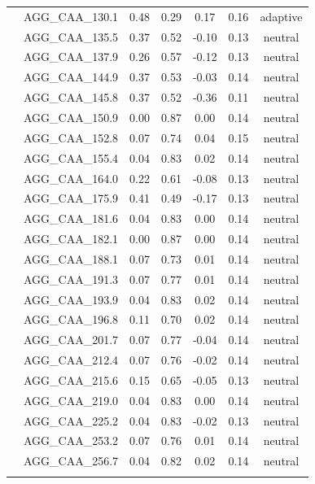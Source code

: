 \documentclass[11pt,]{article}
\begin{document}
\begin{longtable}[c]{@{}lcccccc@{}}
\\\addlinespace
& AGG\_CAA\_130.1 & 0.48 & 0.29 & 0.17 & 0.16 & adaptive
\\\addlinespace
& AGG\_CAA\_135.5 & 0.37 & 0.52 & -0.10 & 0.13 & neutral
\\\addlinespace
& AGG\_CAA\_137.9 & 0.26 & 0.57 & -0.12 & 0.13 & neutral
\\\addlinespace
& AGG\_CAA\_144.9 & 0.37 & 0.53 & -0.03 & 0.14 & neutral
\\\addlinespace
& AGG\_CAA\_145.8 & 0.37 & 0.52 & -0.36 & 0.11 & neutral
\\\addlinespace
& AGG\_CAA\_150.9 & 0.00 & 0.87 & 0.00 & 0.14 & neutral
\\\addlinespace
& AGG\_CAA\_152.8 & 0.07 & 0.74 & 0.04 & 0.15 & neutral
\\\addlinespace
& AGG\_CAA\_155.4 & 0.04 & 0.83 & 0.02 & 0.14 & neutral
\\\addlinespace
& AGG\_CAA\_164.0 & 0.22 & 0.61 & -0.08 & 0.13 & neutral
\\\addlinespace
& AGG\_CAA\_175.9 & 0.41 & 0.49 & -0.17 & 0.13 & neutral
\\\addlinespace
& AGG\_CAA\_181.6 & 0.04 & 0.83 & 0.00 & 0.14 & neutral
\\\addlinespace
& AGG\_CAA\_182.1 & 0.00 & 0.87 & 0.00 & 0.14 & neutral
\\\addlinespace
& AGG\_CAA\_188.1 & 0.07 & 0.73 & 0.01 & 0.14 & neutral
\\\addlinespace
& AGG\_CAA\_191.3 & 0.07 & 0.77 & 0.01 & 0.14 & neutral
\\\addlinespace
& AGG\_CAA\_193.9 & 0.04 & 0.83 & 0.02 & 0.14 & neutral
\\\addlinespace
& AGG\_CAA\_196.8 & 0.11 & 0.70 & 0.02 & 0.14 & neutral
\\\addlinespace
& AGG\_CAA\_201.7 & 0.07 & 0.77 & -0.04 & 0.14 & neutral
\\\addlinespace
& AGG\_CAA\_212.4 & 0.07 & 0.76 & -0.02 & 0.14 & neutral
\\\addlinespace
& AGG\_CAA\_215.6 & 0.15 & 0.65 & -0.05 & 0.13 & neutral
\\\addlinespace
& AGG\_CAA\_219.0 & 0.04 & 0.83 & 0.00 & 0.14 & neutral
\\\addlinespace
& AGG\_CAA\_225.2 & 0.04 & 0.83 & -0.02 & 0.13 & neutral
\\\addlinespace
& AGG\_CAA\_253.2 & 0.07 & 0.76 & 0.01 & 0.14 & neutral
\\\addlinespace
& AGG\_CAA\_256.7 & 0.04 & 0.82 & 0.02 & 0.14 & neutral
\\\addlinespace

\end{longtable}
\end{document}
